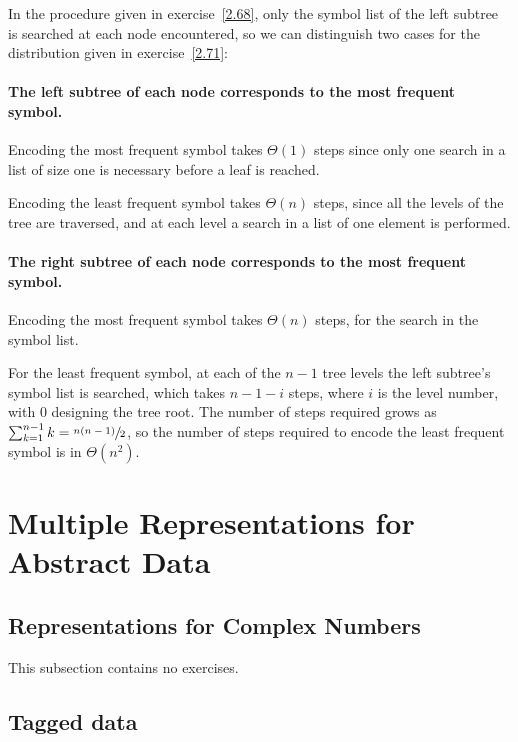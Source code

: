 \begin{exe}[2.72]
    In the  procedure given in exercise~\ref{2.68}, only the 
    symbol list of the left subtree is searched at each node encountered, so we 
    can distinguish two cases for the distribution given in exercise~\ref{2.71}:

    \paragraph*{The left subtree of each node corresponds to the most frequent 
    symbol.}
    Encoding the most frequent symbol takes $\Theta(1)$ steps since only 
    one search in a list of size one is necessary before a leaf is reached.

    Encoding the least frequent symbol takes $\Theta(n)$ steps, since 
    all the levels of the tree are traversed, and at each level a search in 
    a list of one element is performed.

    \paragraph*{The right subtree of each node corresponds to the most frequent 
    symbol.}
    Encoding the most frequent symbol takes $\Theta(n)$ steps, for the search in 
    the symbol list.

    For the least frequent symbol, at each of the $n - 1$ tree levels the left 
    subtree’s symbol list is searched, which takes $n - 1 - i$ steps, where $i$ 
    is the level number, with $0$ designing the tree root. The number of steps 
    required grows as $\sum_{k = 1}^{n - 1} k = \sfrac{n (n - 1)}{2}$, so the 
    number of steps required to encode the least frequent symbol is in 
    $\Theta(n^2)$.
\end{exe}

\section{Multiple Representations for Abstract Data}

\subsection{Representations for Complex Numbers}

This subsection contains no exercises.

\subsection{Tagged data}

